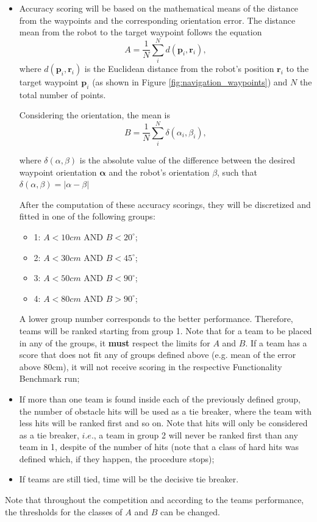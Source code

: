 \begin{itemize}
  \item{Accuracy scoring will be based on the mathematical means of the distance from the waypoints and the corresponding orientation error. The distance mean from the robot to the target waypoint follows the equation
\begin{equation}
    A = \frac{1}{N}\sum_{i}^{N}d\left(\mathbf{p}_i, \mathbf{r}_i\right),
    \nonumber
\end{equation}
where $d\left(\mathbf{p}_i, \mathbf{r}_i\right)$ is the Euclidean distance from the robot's position $ \mathbf{r}_i$ to the target waypoint $\mathbf{p}_i$ (as shown in Figure \ref{fig:navigation_waypoints}) and $N$ the total number of points. 

Considering the orientation, the mean is 
\begin{equation}
    B = \frac{1}{N}\sum_{i}^{N}\delta\left(\alpha_i, \beta _i\right),
    \nonumber
\end{equation}

where $\delta\left(\alpha, \beta \right)$ is the absolute value of the difference between the desired waypoint orientation $\mathbf{\alpha}$ and the robot's orientation $\beta$, such that $\delta\left(\alpha, \beta \right)=\left | \alpha- \beta \right |$ 


After the computation of these accuracy scorings, they will be discretized and fitted in one of the following groups:
\begin{itemize}
    \item 1: $A<10cm$ AND $B<20^{\circ}$;
    \item 2: $A<30cm$ AND $B<45^{\circ}$;
    \item 3: $A<50cm$ AND $B<90^{\circ}$;
    \item 4: $A<80cm$ AND $B>90^{\circ}$;
\end{itemize}
A lower group number corresponds to the better performance. Therefore, teams will be ranked starting from group 1. Note that for a team to be placed in any of the groups, it \textbf{must} respect the limits for $A$ and $B$. If a team has a score that does not fit any of groups defined above (e.g. mean of the error above 80cm), it will not receive scoring in the respective Functionality Benchmark run;}
  \item{If more than one team is found inside each of the previously defined group, the number of obstacle hits will be used as a tie breaker, where the team with less hits will be ranked first and so on. Note that hits will only be considered as a tie breaker, $i.e.$, a team in group 2 will never be ranked first than any team in 1, despite of the number of hits (note that a class of hard hits was defined which, if they happen, the procedure stops);}
  \item{If teams are still tied, time will be the decisive tie breaker.}
  \end{itemize}

Note that throughout the competition and according to the teams performance, the thresholds for the classes of $A$ and $B$ can be changed.

